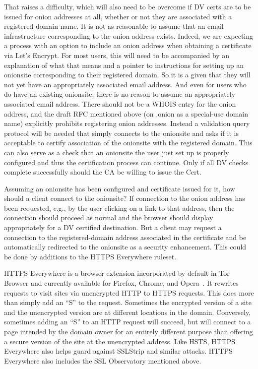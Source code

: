 \documentclass[10pt, conference, compsocconf]{styles/IEEEtran}
\begin{document}
That raises a difficulty, which will also need to be overcome if DV
certs are to be issued for onion addresses at all, whether or not they
are associated with a registered domain name.  It is not as reasonable
to assume that an email infrastructure corresponding to the onion
address exists. Indeed, we are expecting a process with an option to
include an onion address when obtaining a certificate via Let's
Encrypt.  For most users, this will need to be accompanied by an
explanation of what that means and a pointer to instructions for
setting up an onionsite corresponding to their registered domain. So
it is a given that they will not yet have an appropriately associated
email address.  And even for users who do have an existing onionsite,
there is no reason to assume an appropriately associated email
address. There should not be a WHOIS entry for the onion address, and
the draft RFC mentioned above (on .onion as a special-use domain name)
explicitly prohibits registering onion addresses.  Instead a
validation query protocol will be needed that simply connects to the
onionsite and asks if it is acceptable to certify association of the
onionsite with the registered domain.  This can also serve as a check
that an onionsite the user just set up is properly configured and thus
the certification process can continue.  Only if all DV checks
complete successfully should the CA be willing to issue the Cert.


Assuming an onionsite has been configured and certificate issued for
it, how should a client connect to the onionsite? If connection
to the onion address has been requested, e.g., by the user
clicking on a link to that address, then the connection should
proceed as normal and the browser should display appropriately for a
DV certified destination. But a client may request a connection
to the registered-domain address associated in the certificate
and be automatically redirected to the onionsite as a security
enhancement. This could be done by additions to the HTTPS Everywhere
ruleset.

HTTPS Everywhere is a browser extension incorporated by default in Tor
Browser and currently available for Firefox, Chrome, and
Opera~\cite{https-everywhere}. It rewrites requests to visit sites via
unencrypted HTTP to HTTPS requests. This does more than simply add an
``S'' to the request. Sometimes the encrypted version of a site and
the unencrypted version are at different locations in the domain.
Conversely, sometimes adding an ``S'' to an HTTP request will
succeed, but will connect to a page intended by the domain owner for an
entirely different purpose than offering a secure version of the site
at the unencrypted address.  Like HSTS, HTTPS Everywhere also helps
guard against SSLStrip and similar attacks. HTTPS Everywhere
also includes the SSL Observatory mentioned above.
\end{document}
